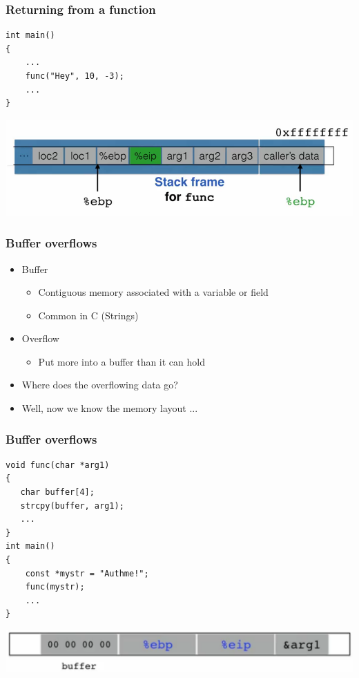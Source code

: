 \documentclass[serif,mathserif]{beamer}
\begin{document}
\begin{frame}[fragile]
  \frametitle{Returning from a function}
\begin{lstlisting}
int main()
{
    ...
    func("Hey", 10, -3);
    ...
}
\end{lstlisting}
\begin{center}
\includegraphics[scale=0.35]{stackff4.png}
\end{center}

\end{frame}



\begin{frame}[fragile]
  \frametitle{Buffer overflows}
  \begin{itemize}
  	\item Buffer
  	\begin{itemize}
  		\item Contiguous memory associated with a variable or field
  		\item Common in C (Strings)
  	\end{itemize}
  	\item Overflow
  	\begin{itemize}
  		\item Put more into a buffer than it can hold
  	\end{itemize}
	\item Where does the overflowing data go?
		\item Well, now we know the memory layout ... 
  \end{itemize}
\end{frame}


\begin{frame}[fragile]
  \frametitle{Buffer overflows}
\begin{lstlisting}
void func(char *arg1)
{
   char buffer[4];
   strcpy(buffer, arg1);
   ...
}
int main()
{
    const *mystr = "Authme!";
    func(mystr);
    ...
}
\end{lstlisting}
\begin{center}
\includegraphics[scale=0.20]{stackff5.png}
\end{center}

\end{frame}
\end{document}
